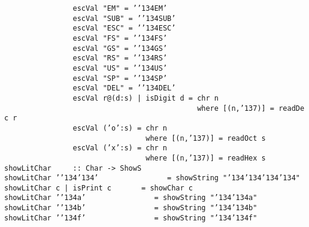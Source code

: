 \mbox{\tt \ \ \ \ \ \ \ \ \ \ \ \ \ \ \ \ escVal\ "EM"\ =\ '{\char'134}EM'}\\
\mbox{\tt \ \ \ \ \ \ \ \ \ \ \ \ \ \ \ \ escVal\ "SUB"\ =\ '{\char'134}SUB'}\\
\mbox{\tt \ \ \ \ \ \ \ \ \ \ \ \ \ \ \ \ escVal\ "ESC"\ =\ '{\char'134}ESC'}\\
\mbox{\tt \ \ \ \ \ \ \ \ \ \ \ \ \ \ \ \ escVal\ "FS"\ =\ '{\char'134}FS'}\\
\mbox{\tt \ \ \ \ \ \ \ \ \ \ \ \ \ \ \ \ escVal\ "GS"\ =\ '{\char'134}GS'}\\
\mbox{\tt \ \ \ \ \ \ \ \ \ \ \ \ \ \ \ \ escVal\ "RS"\ =\ '{\char'134}RS'}\\
\mbox{\tt \ \ \ \ \ \ \ \ \ \ \ \ \ \ \ \ escVal\ "US"\ =\ '{\char'134}US'}\\
\mbox{\tt \ \ \ \ \ \ \ \ \ \ \ \ \ \ \ \ escVal\ "SP"\ =\ '{\char'134}SP'}\\
\mbox{\tt \ \ \ \ \ \ \ \ \ \ \ \ \ \ \ \ escVal\ "DEL"\ =\ '{\char'134}DEL'}\\
\mbox{\tt \ \ \ \ \ \ \ \ \ \ \ \ \ \ \ \ escVal\ r@(d:s)\ |\ isDigit\ d\ =\ chr\ n}\\
\mbox{\tt \ \ \ \ \ \ \ \ \ \ \ \ \ \ \ \ \ \ \ \ \ \ \ \ \ \ \ \ \ \ \ \ \ \ \ \ \ \ \ \ \ \ \ \ \ where\ [(n,{\char'137})]\ =\ readDec\ r}\\
\mbox{\tt \ \ \ \ \ \ \ \ \ \ \ \ \ \ \ \ escVal\ ('o':s)\ =\ chr\ n}\\
\mbox{\tt \ \ \ \ \ \ \ \ \ \ \ \ \ \ \ \ \ \ \ \ \ \ \ \ \ \ \ \ \ \ \ \ \ where\ [(n,{\char'137})]\ =\ readOct\ s}\\
\mbox{\tt \ \ \ \ \ \ \ \ \ \ \ \ \ \ \ \ escVal\ ('x':s)\ =\ chr\ n}\\
\mbox{\tt \ \ \ \ \ \ \ \ \ \ \ \ \ \ \ \ \ \ \ \ \ \ \ \ \ \ \ \ \ \ \ \ \ where\ [(n,{\char'137})]\ =\ readHex\ s}
\eprogB\noindent\bprogB
\mbox{\tt showLitChar\ \ \ \ \ ::\ Char\ ->\ ShowS}\\
\mbox{\tt showLitChar\ '{\char'134}{\char'134}'\ \ \ \ \ \ \ \ \ \ \ \ \ \ \ \ =\ showString\ "{\char'134}{\char'134}{\char'134}{\char'134}"}\\
\mbox{\tt showLitChar\ c\ |\ isPrint\ c\ \ \ \ \ \ \ =\ showChar\ c}\\
\mbox{\tt showLitChar\ '{\char'134}a'\ \ \ \ \ \ \ \ \ \ \ \ \ \ \ \ =\ showString\ "{\char'134}{\char'134}a"}\\
\mbox{\tt showLitChar\ '{\char'134}b'\ \ \ \ \ \ \ \ \ \ \ \ \ \ \ \ =\ showString\ "{\char'134}{\char'134}b"}\\
\mbox{\tt showLitChar\ '{\char'134}f'\ \ \ \ \ \ \ \ \ \ \ \ \ \ \ \ =\ showString\ "{\char'134}{\char'134}f"}\\
